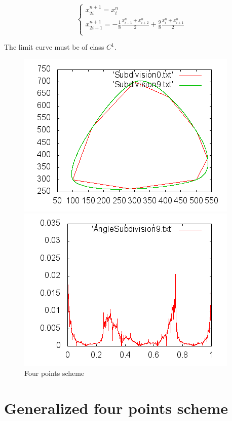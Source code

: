 \documentclass[a4paper,11pt]{article}
\begin{document}
$$
    \begin{cases}
        x_{2i}^{n+1} = x_i^n \\
        x_{2i+1}^{n+1} = -\frac{1}{8} \frac{x_{i-1}^n + x_{i+2}^n}{2} +
        \frac{9}{8} \frac{x_i^n + x_{i+1}^n}{2} \\
    \end{cases}
$$

The limit curve must be of class $ C^1 $.

\begin{figure}[H]
\centering
\begin{minipage}{0.35\paperwidth}
\includegraphics[scale=0.75]{pic/poly2.png}
\end{minipage}
\begin{minipage}{0.35\paperwidth}
\includegraphics[scale=0.75]{pic/angle2.png}
\end{minipage}
\caption{Four points scheme}
\end{figure}

\section{Generalized four points scheme}
\end{document}
